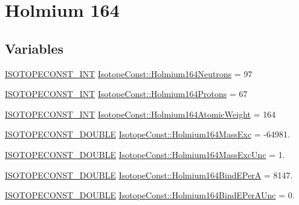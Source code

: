 \hypertarget{group___isotope_const-_holmium-_ho164}{}\section{Holmium 164}
\label{group___isotope_const-_holmium-_ho164}
\subsection*{Variables}
\begin{DoxyCompactItemize}
\item 
\mbox{\hyperlink{group___isotope_const-_macros_ga5f18360b3e99483a35c32d789e62621c}{I\+S\+O\+T\+O\+P\+E\+C\+O\+N\+S\+T\+\_\+\+I\+NT}} \mbox{\hyperlink{group___isotope_const-_holmium-_ho164_gad93f47399b1d3e6dc9628c0e2c81711a}{Isotope\+Const\+::\+Holmium164\+Neutrons}} = 97
\item 
\mbox{\hyperlink{group___isotope_const-_macros_ga5f18360b3e99483a35c32d789e62621c}{I\+S\+O\+T\+O\+P\+E\+C\+O\+N\+S\+T\+\_\+\+I\+NT}} \mbox{\hyperlink{group___isotope_const-_holmium-_ho164_ga32bbb4453e5a299fa293bccb0de4928a}{Isotope\+Const\+::\+Holmium164\+Protons}} = 67
\item 
\mbox{\hyperlink{group___isotope_const-_macros_ga5f18360b3e99483a35c32d789e62621c}{I\+S\+O\+T\+O\+P\+E\+C\+O\+N\+S\+T\+\_\+\+I\+NT}} \mbox{\hyperlink{group___isotope_const-_holmium-_ho164_ga60517fc3337a3829e7b0d7b77f7c1ac9}{Isotope\+Const\+::\+Holmium164\+Atomic\+Weight}} = 164
\item 
\mbox{\hyperlink{group___isotope_const-_macros_ga8f45a7272ce02c0b4c65c44636ed719a}{I\+S\+O\+T\+O\+P\+E\+C\+O\+N\+S\+T\+\_\+\+D\+O\+U\+B\+LE}} \mbox{\hyperlink{group___isotope_const-_holmium-_ho164_ga975f45cb966a2b1b5cfe98a9e47276fd}{Isotope\+Const\+::\+Holmium164\+Mass\+Exc}} = -\/64981.
\item 
\mbox{\hyperlink{group___isotope_const-_macros_ga8f45a7272ce02c0b4c65c44636ed719a}{I\+S\+O\+T\+O\+P\+E\+C\+O\+N\+S\+T\+\_\+\+D\+O\+U\+B\+LE}} \mbox{\hyperlink{group___isotope_const-_holmium-_ho164_gaa0175a4af368c178eb4836456f08eb2f}{Isotope\+Const\+::\+Holmium164\+Mass\+Exc\+Unc}} = 1.
\item 
\mbox{\hyperlink{group___isotope_const-_macros_ga8f45a7272ce02c0b4c65c44636ed719a}{I\+S\+O\+T\+O\+P\+E\+C\+O\+N\+S\+T\+\_\+\+D\+O\+U\+B\+LE}} \mbox{\hyperlink{group___isotope_const-_holmium-_ho164_ga2a37c1429bf37d0327635887849167cb}{Isotope\+Const\+::\+Holmium164\+Bind\+E\+PerA}} = 8147.
\item 
\mbox{\hyperlink{group___isotope_const-_macros_ga8f45a7272ce02c0b4c65c44636ed719a}{I\+S\+O\+T\+O\+P\+E\+C\+O\+N\+S\+T\+\_\+\+D\+O\+U\+B\+LE}} \mbox{\hyperlink{group___isotope_const-_holmium-_ho164_ga0520a97c59a6c65d934d966e3880cf5d}{Isotope\+Const\+::\+Holmium164\+Bind\+E\+Per\+A\+Unc}} = 0.

\end{DoxyCompactItemize}

